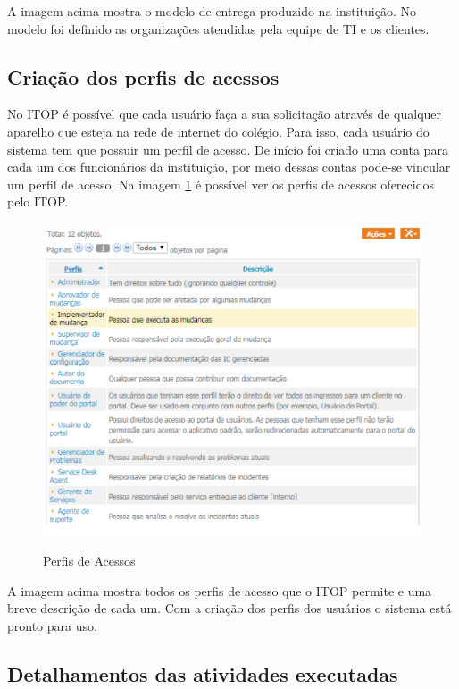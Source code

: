 \documentclass[eso]{bcc}
\begin{document}
A imagem acima mostra o modelo de entrega produzido na instituição. No modelo foi definido as organizações atendidas pela equipe de TI e os clientes.

\subsection{Criação dos perfis de acessos}

No ITOP é possível que cada usuário faça a sua solicitação através de qualquer aparelho que esteja na rede de internet do colégio. Para isso, cada usuário do sistema tem que possuir um perfil de acesso.  De início foi criado uma conta para cada um dos funcionários da instituição, por meio dessas contas pode-se vincular um perfil de acesso. Na imagem \ref{perfil} é possível  ver os perfis de acessos oferecidos pelo ITOP. 

\newpage

\begin{figure}[!h]
\centering
\caption[perfil]{Perfis de Acessos}
\includegraphics[scale=0.9]{Figuras/itop7.png}
\label{perfil}
\end{figure}

A imagem acima mostra todos os perfis de acesso que o ITOP permite e uma breve descrição de cada um. Com a criação dos perfis dos usuários o sistema  está pronto para uso.

\subsection{Detalhamentos das atividades executadas}
\end{document}
